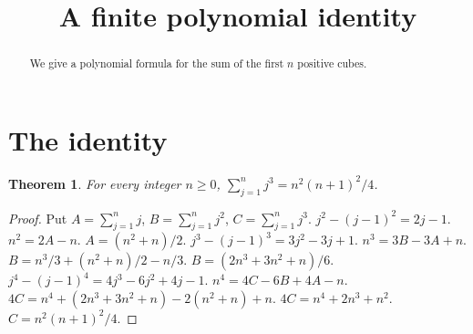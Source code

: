\documentclass{article}
\title{A finite polynomial identity}
\newtheorem{theorem}{Theorem}
\begin{document}
\begin{abstract}
We give a polynomial formula for the sum of the first $n$ positive cubes.
\end{abstract}
\section{The identity}
\begin{theorem}\label{thm:cubes}
For every integer $n\geq0$,
$\sum_{j=1}^n j^3=n^2(n+1)^2/4$.
\end{theorem}
\begin{proof}
Put $A=\sum_{j=1}^n j$, $B=\sum_{j=1}^n j^2$, $C=\sum_{j=1}^n j^3$.
$j^2-(j-1)^2=2j-1$.
$n^2=2A-n$.
$A=(n^2+n)/2$.
$j^3-(j-1)^3=3j^2-3j+1$.
$n^3=3B-3A+n$.
$B=n^3/3+(n^2+n)/2-n/3$.
$B=(2n^3+3n^2+n)/6$.
$j^4-(j-1)^4=4j^3-6j^2+4j-1$.
$n^4=4C-6B+4A-n$.
$4C=n^4+(2n^3+3n^2+n)-2(n^2+n)+n$.
$4C=n^4+2n^3+n^2$.
$C=n^2(n+1)^2/4$.
\end{proof}
\end{document}
